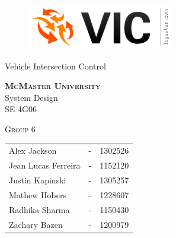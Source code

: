 \documentclass [10pt]{article}
\begin{document}
\begin {center} 

\thispagestyle{empty}
\vspace*{5cm}

\begin {figure}[h!]
\centering
\hspace{-10mm}\includegraphics [scale = .5, trim={.4cm 0 .8cm 0},clip] {figures/vic_logo.png}
\end {figure}

{\fontfamily{\cabinfamily}\selectfont
\Huge{Vehicle Intersection Control} }

\vspace{1 cm}
{\Large\textbf{\textsc{McMaster University}}\\}  \vspace {1cm}
{\Large System Design\\ \vspace {0.4 cm} SE 4G06}  \vspace {1cm}

{\large \textsc{Group 6} \\} \vspace{1cm}

\begin{tabular}{ l c  l}
Alex Jackson &-& 1302526\\
Jean Lucas Ferreira &-& 1152120 \\
Justin Kapinski &-& 1305257\\
Mathew Hobers &-& 1228607\\
Radhika Sharma &-& 1150430\\
Zachary Bazen &-& 1200979
\end{tabular}




\end{center}


\pagebreak


\tableofcontents
\listoftables
\listoffigures



\pagebreak


\end{document}
